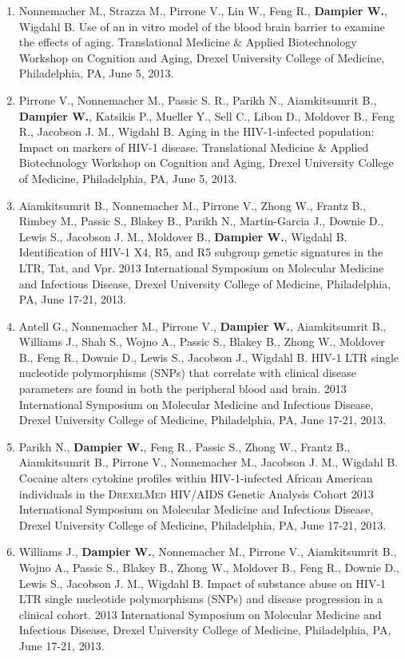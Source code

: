 \documentclass[a4paper,11pt]{article}
\begin{document}
\begin{enumerate}
\begin{itemize}
\begin{enumerate}[label=\arabic{enumii}.]
   \item Nonnemacher M., Strazza M., Pirrone V., Lin W., Feng R., \textbf{Dampier W.}, Wigdahl B. Use of an in vitro model of the blood brain barrier to examine the effects of aging. Translational Medicine \& Applied Biotechnology Workshop on Cognition and Aging, Drexel University College of Medicine, Philadelphia, PA, June 5, 2013.
   \item Pirrone V., Nonnemacher M., Passic S. R., Parikh N., Aiamkitsumrit B., \textbf{Dampier W.}, Katsikis P., Mueller Y., Sell C., Libon D., Moldover B., Feng R., Jacobson J. M., Wigdahl B. Aging in the HIV-1-infected population: Impact on markers of HIV-1 disease. Translational Medicine \& Applied Biotechnology Workshop on Cognition and Aging, Drexel University College of Medicine, Philadelphia, PA, June 5, 2013.
   \item Aiamkitsumrit B., Nonnemacher M., Pirrone V., Zhong W., Frantz B., Rimbey M., Passic S., Blakey B., Parikh N., Martin-Garcia J., Downie D., Lewis S., Jacobson J. M., Moldover B., \textbf{Dampier W.}, Wigdahl B. Identification of HIV-1 X4, R5, and R5 subgroup genetic signatures in the LTR, Tat, and Vpr. 2013 International Symposium on Molecular Medicine and Infectious Disease, Drexel University College of Medicine, Philadelphia, PA, June 17-21, 2013.
   \item Antell G., Nonnemacher M., Pirrone V., \textbf{Dampier W.}, Aiamkitsumrit B., Williams J., Shah S., Wojno A., Passic S., Blakey B., Zhong W., Moldover B., Feng R., Downie D., Lewis S., Jacobson J., Wigdahl B. HIV-1 LTR single nucleotide polymorphisms (SNPs) that correlate with clinical disease parameters are found in both the peripheral blood and brain. 2013 International Symposium on Molecular Medicine and Infectious Disease, Drexel University College of Medicine, Philadelphia, PA, June 17-21, 2013.
   \item Parikh N., \textbf{Dampier W.}, Feng R., Passic S., Zhong W., Frantz B., Aiamkitsumrit B., Pirrone V., Nonnemacher M., Jacobson J. M., Wigdahl B. Cocaine alters cytokine profiles within HIV-1-infected African American individuals in the \textsc{DrexelMed} HIV/AIDS Genetic Analysis Cohort 2013 International Symposium on Molecular Medicine and Infectious Disease, Drexel University College of Medicine, Philadelphia, PA, June 17-21, 2013.
   \item Williams J., \textbf{Dampier W.}, Nonnemacher M., Pirrone V., Aiamkitsumrit B., Wojno A., Passic S., Blakey B., Zhong W., Moldover B., Feng R., Downie D., Lewis S., Jacobson J. M., Wigdahl B. Impact of substance abuse on HIV-1 LTR single nucleotide polymorphisms (SNPs) and disease progression in a clinical cohort. 2013 International Symposium on Molecular Medicine and Infectious Disease, Drexel University College of Medicine, Philadelphia, PA, June 17-21, 2013.

\end{enumerate}
\end{itemize}
\end{enumerate}
\end{document}
